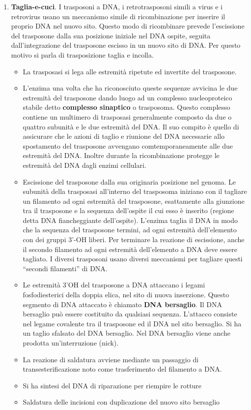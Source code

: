 \documentclass[]{article}
\begin{document}
\begin{enumerate}
\def\labelenumi{\arabic{enumi}.}
\item
  \textbf{Taglia-e-cuci}. I trasposoni a DNA, i retrotrasposoni simili a
  virus e i retrovirus usano un meccanismo simile di ricombinazione per
  inserire il proprio DNA nel nuovo sito. Questo modo di ricombinare
  prevede l'escissione del trasposone dalla sua posizione iniziale nel
  DNA ospite, seguita dall'integrazione del trasposone escisso in un
  nuovo sito di DNA. Per questo motivo si parla di trasposizione taglia
  e incolla.

  \begin{itemize}
  \itemsep1pt\parskip0pt
  \item
    La trasposasi si lega alle estremità ripetute ed invertite del
    trasposone.
  \item
    L'enzima una volta che ha riconosciuto queste sequenze avvicina le
    due estremità del trasposone dando luogo ad un complesso
    nucleoproteico stabile detto \textbf{complesso sinaptico} o
    trasposoma. Questo complesso contiene un multimero di trasposasi
    generalmente composto da due o quattro subunità e le due estremità
    del DNA. Il suo compito è quello di assicurare che le azioni di
    taglio e riunione del DNA necessarie allo spostamento del trasposone
    avvengano comtemporaneamente alle due estremità del DNA. Inoltre
    durante la ricombinazione protegge le estremità del DNA dagli enzimi
    cellulari.
  \item
    Escissione del trasposone dalla sua originaria posizione nel genoma.
    Le subunità della trasposasi all'interno del trasposoma iniziano con
    il tagliare un filamento ad ogni estremità del trasposone,
    esattamente alla giunzione tra il trasposone e la sequenza
    dell'ospite il cui esso è inserito (regione detta DNA fiancheggiante
    dell'ospite). L'enzima taglia il DNA in modo che la sequenza del
    trasposone termini, ad ogni estremità dell'elemento con dei gruppi
    3'-OH liberi. Per terminare la reazione di escissione, anche il
    secondo filamento ad ogni estremità dell'elemento a DNA deve essere
    tagliato. I diversi trasposoni usano diversi meccanismi per tagliare
    questi ``secondi filamenti'' di DNA.
  \item
    Le estremità 3'OH del trasposone a DNA attaccano i legami
    fosfodiesterici della doppia elica, nel sito di nuova inserzione.
    Questo segmento di DNA attaccato è chiamato \textbf{DNA bersaglio}.
    Il DNA bersaglio può essere costituito da qualsiasi sequenza.
    L'attacco consiste nel legame covalente tra il trasposone ed il DNA
    nel sito bersaglio. Si ha un taglio sfalsato del DNA bersaglio. Nel
    DNA bersaglio viene anche prodotta un'interruzione (nick).
  \item
    La reazione di saldatura avviene mediante un passaggio di
    transesterificazione noto come trasferimento del filamento a DNA.
  \item
    Si ha sintesi del DNA di riparazione per riempire le rotture
  \item
    Saldatura delle incisioni con duplicazione del nuovo sito bersaglio
  \end{itemize}
\end{enumerate}
\end{document}
